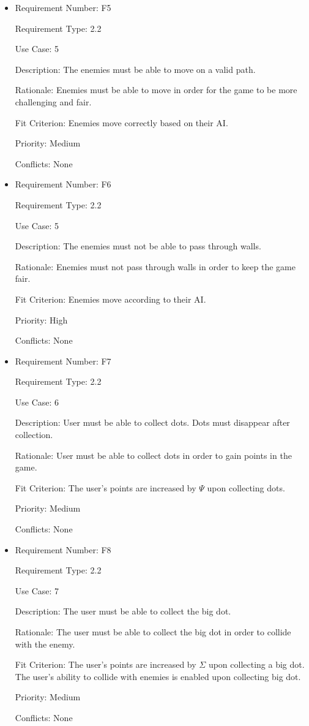 \documentclass[12pt, titlepage]{article}
\begin{document}
\begin{itemize}
\item
Requirement Number: F5

Requirement Type: 2.2

Use Case: 5

Description: The enemies must be able to move on a valid path.

Rationale: Enemies must be able to move in order for the game to be more challenging and fair.

Fit Criterion: Enemies move correctly based on their AI.

Priority: Medium

Conflicts: None
\end{itemize}

\begin{itemize}
\item
Requirement Number: F6

Requirement Type: 2.2

Use Case: 5

Description: The enemies must not be able to pass through walls.

Rationale: Enemies must not pass through walls in order to keep the game fair.

Fit Criterion: Enemies move according to their AI.

Priority: High

Conflicts: None
\end{itemize}

\begin{itemize}
\item
Requirement Number: F7

Requirement Type: 2.2

Use Case: 6

Description: User must be able to collect dots. Dots must disappear after collection.

Rationale: User must be able to collect dots in order to gain points in the game.

Fit Criterion: The user's points are increased by $\hyperref[tab:constants]{\Psi}$ upon collecting dots.

Priority: Medium

Conflicts: None
\end{itemize}

\begin{itemize}
\item
Requirement Number: F8

Requirement Type: 2.2

Use Case: 7

Description: The user must be able to collect the big dot.

Rationale: The user must be able to collect the big dot in order to collide with the enemy.

Fit Criterion: The user's points are increased by $\hyperref[tab:constants]{\Sigma}$ upon collecting a big dot. The user's ability to collide with enemies is enabled upon collecting big dot.

Priority: Medium

Conflicts: None
\end{itemize}
\end{document}
